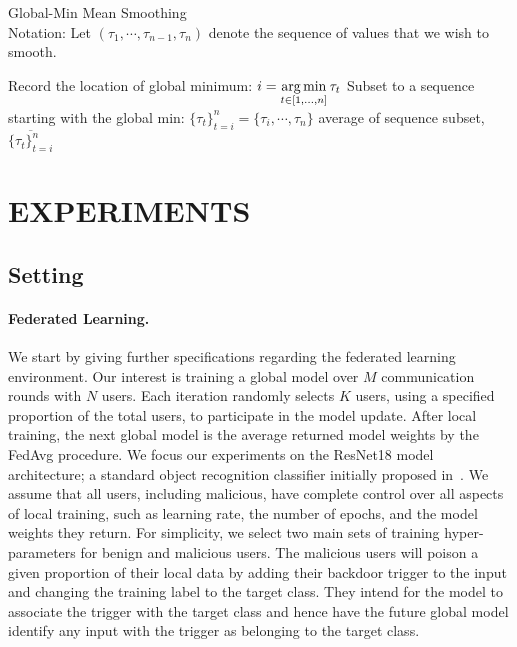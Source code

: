 \documentclass{article} %
\begin{document}
\begin{algorithm}[H]
\caption{Global-Min Mean Smoothing \\ 
Notation: Let $(\tau_1, \cdots, \tau_{n - 1}, \tau_n)$ denote the sequence of values that we wish to smooth.
}
\label{alg: smoothing}
\begin{algorithmic}[1]

        \State Record the location of global minimum: $i = \operatorname*{arg\,min}\limits_{t \in [1,...,n] } \tau_t$
        \State Subset to a sequence starting with the global min: $\{\tau_t\}_{t=i}^n = \{\tau_i, \cdots, \tau_n \}$
        \State \Return average of sequence subset, $\overline{\{\tau_t\}_{t=i}^n}$
    \EndProcedure
\end{algorithmic}
\end{algorithm}

\section{EXPERIMENTS}

\subsection{Setting}

\paragraph{Federated Learning.} We start by giving further specifications regarding the federated learning environment. Our interest is training a global model over $M$ communication rounds with $N$ users. Each iteration randomly selects $K$ users, using a specified proportion of the total users, to participate in the model update. After local training, the next global model is the average returned model weights by the FedAvg procedure. We focus  our experiments on the ResNet18 model architecture; a standard object recognition classifier initially proposed in~\cite{resnet}. We assume that all users, including malicious, have complete control over all aspects of local training, such as learning rate, the number of epochs, and the model weights they return. For simplicity, we select two main sets of training hyper-parameters for benign and malicious users. The malicious users will poison a given proportion of their local data by adding their backdoor trigger to the input and changing the training label to the target class. They intend for the model to associate the trigger with the target class and hence have the future global model identify any input with the trigger as belonging to the target class. 
\end{document}
